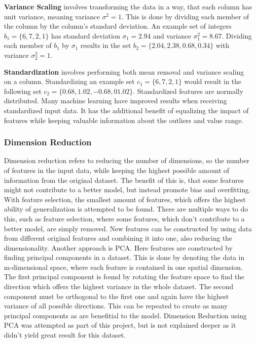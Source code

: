 \textbf{Variance Scaling} involves transforming the data in a way, that each column has unit variance, meaning variance
$\sigma^2 = 1$.\cite{ScikitPreprocessing} This is done by dividing each member of the column by the column's standard deviation.
An example set of integers $b_1 = \{6, 7, 2, 1\}$ has standard deviation $\sigma_1 = 2.94$ and variance $\sigma_1^2 = 8.67$.
Dividing each member of $b_1$ by $\sigma_1$ results in the set $b_2 = \{2.04, 2.38, 0.68, 0.34\}$ with variance $\sigma_2^2 = 1$.

\textbf{Standardization} involves performing both mean removal and variance scaling on a column.\cite{ScikitPreprocessing}
Standardizing an example set $c_1 = \{6, 7, 2, 1\}$ would result in the following set $c_2 = \{0.68, 1.02, -0.68, 01.02\}$.
Standardized features are normally distributed. Many machine learning have improved results when receiving standardized input
data. It has the additional benefit of equalizing the impact of features while keeping valuable information about the outliers
and value range.\cite[35]{Subasi2020}

\subsubsection{Dimension Reduction}
\label{sec:Dimension Reduction}

Dimension reduction refers to reducing the number of dimensions, so the number of
features in the input data, while keeping the highest possible amount of information from
the original dataset. The benefit of this is, that some features might not contribute to a better model,
but instead promote bias and overfitting. With feature selection, the smallest amount of features,
which offers the highest ability of generalization is attempted to be found.
There are multiple ways to do this, such as feature selection, where some features, which don't
contribute to a better model, are simply removed.
New features can be constructed by using data from different original features and
combining it into one, also reducing the dimensionality.
Another approach is \ac{PCA}. Here features are constructed by finding
principal components in a dataset. This is done by denoting the data in m-dimensional space,
where each feature is contained in one spatial dimension.
The first principal component is found by rotating the feature space to find the direction
which offers the highest variance in the whole dataset.
The second component must be orthogonal to the first one and again have the highest variance
of all possible directions. This can be repeated to create as many principal components as are benefitial to the model.
Dimension Reduction using \ac{PCA} was attempted as part of this project,
but is not explained deeper as it didn't yield great result for this dataset.

